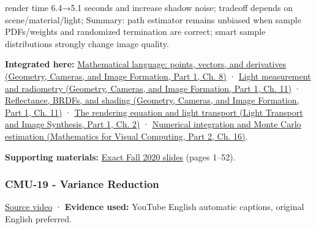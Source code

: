 render time 6.4→5.1 seconds and increase shadow noise; tradeoff depends on scene/material/light; Summary: path estimator remains unbiased when sample PDFs/weights and randomized termination are correct; smart sample distributions strongly change image quality.

\textbf{Integrated here:} \href{../03-Geometry-Cameras-and-Image-Formation-P01/main.pdf\#03-visual-computing-i-ch001-mathematical-language-points-vectors-and-derivatives}{Mathematical language: points, vectors, and derivatives (Geometry, Cameras, and Image Formation, Part 1, Ch. 8)} · \href{../03-Geometry-Cameras-and-Image-Formation-P01/main.pdf\#03-visual-computing-i-ch004-light-measurement-and-radiometry}{Light measurement and radiometry (Geometry, Cameras, and Image Formation, Part 1, Ch. 11)} · \href{../03-Geometry-Cameras-and-Image-Formation-P01/main.pdf\#03-visual-computing-i-ch004-reflectance-brdfs-and-shading}{Reflectance, BRDFs, and shading (Geometry, Cameras, and Image Formation, Part 1, Ch. 11)} · \href{../04-Light-Transport-and-Image-Synthesis-P01/main.pdf\#03-visual-computing-i-ch007-the-rendering-equation-and-light-transport}{The rendering equation and light transport (Light Transport and Image Synthesis, Part 1, Ch. 2)} · \href{../02-Mathematics-for-Visual-Computing-P02/main.pdf\#03-visual-computing-i-ch012-numerical-integration-and-monte-carlo-estimation}{Numerical integration and Monte Carlo estimation (Mathematics for Visual Computing, Part 2, Ch. 16)}.

\textbf{Supporting materials:} \href{https://15462.courses.cs.cmu.edu/fall2020content/lectures/18_montecarloraytracing/18_montecarloraytracing_slides.pdf}{Exact Fall 2020 slides} (pages 1--52).

\subsubsection{CMU-19 - Variance Reduction}\label{04-visual-computing-ii-ch036-cmu-19---variance-reduction}

\hypertarget{04-visual-computing-ii-ch036-cmu-19---variance-reduction}{}

\href{https://www.youtube.com/watch?v=IQhLk_XaFc8}{Source video} · \textbf{Evidence used:} YouTube English automatic captions, original English preferred.

